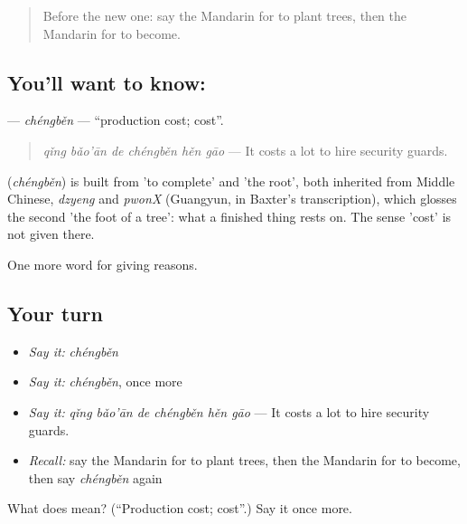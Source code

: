 \label{lesson:ZH-C384-chengben}



\begin{quote}
Before the new one: say the Mandarin for to plant trees, then the Mandarin for to become.
\end{quote}

\subsection*{You'll want to know: }
\textbf{} — \emph{chéngběn} — \textquotedblleft{}production cost; cost\textquotedblright{}.

\begin{quote}
\textbf{} \emph{qǐng bǎo'ān de chéngběn hěn gāo} — It costs a lot to hire security guards.
\end{quote}

\begin{cousinweb}
\textbf{} (\emph{chéngběn}) is built from  'to complete' and  'the root', both inherited from Middle Chinese, \emph{dzyeng} and \emph{pwonX} (Guangyun, in Baxter's transcription), which glosses the second 'the foot of a tree': what a finished thing rests on. The sense 'cost' is not given there.
\end{cousinweb}

\begin{grammarlens}[title={What you've built}]
One more word for giving reasons.
\end{grammarlens}

\subsection*{Your turn}
\begin{itemize}
\raggedright
  \item \emph{Say it:} \emph{chéngběn}
  \item \emph{Say it:} \emph{chéngběn}, once more
  \item \emph{Say it:} \emph{qǐng bǎo'ān de chéngběn hěn gāo} — It costs a lot to hire security guards.
  \item \emph{Recall:} say the Mandarin for to plant trees, then the Mandarin for to become, then say \emph{chéngběn} again
\end{itemize}

\begin{tcolorbox}[breakable,colback=teal!4,colframe=teal!35!black,title={Before you move on}]
What does  mean? (\textquotedblleft{}Production cost; cost\textquotedblright{}.) Say it once more.
\end{tcolorbox}
